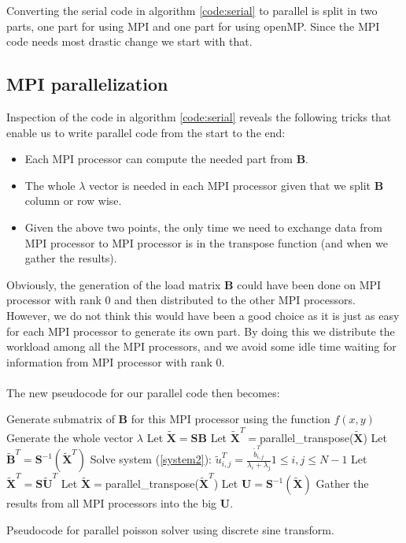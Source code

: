 Converting the serial code in algorithm \ref{code:serial} to parallel is split in two parts, one part for using MPI and one part for using openMP. Since the MPI code needs most drastic change we start with that.

\subsection*{MPI parallelization}
Inspection of the code in algorithm \ref{code:serial} reveals the following tricks that enable us to write parallel code from the start to the end:
\begin{itemize}
\item Each MPI processor can compute the needed part from $\textbf{B}$.
\item The whole $\lambda$ vector is needed in each MPI processor given that we split $\textbf{B}$ column or row wise.
\item Given the above two points, the only time we need to exchange data from MPI processor to MPI processor is in the transpose function (and when we gather the results).
\end{itemize}
Obviously, the generation of the load matrix $\mathbf{B}$ could have been done on MPI processor with rank $0$ and then distributed to the other MPI processors. However, we do not think this would have been a good choice as it is just as easy for each MPI processor to generate its own part. By doing this we distribute the workload among all the MPI processors, and we avoid some idle time waiting for information from MPI processor with rank $0$.\\
\\
The new pseudocode for our parallel code then becomes:\\
\begin{algorithm}[H]
 Generate submatrix of $\textbf{B}$ for this MPI processor using the function $f(x,y)$\;
 Generate the whole vector $\lambda$ \;
 Let $\mathbf{\widetilde{X}} = \mathbf{SB}$  \;
 Let $\mathbf{\widetilde{X}}^T = $parallel\_transpose($\mathbf{\widetilde{X}}$)   \;
 Let $\mathbf{\widetilde{B}}^T = \mathbf{S}^{-1}(\mathbf{\widetilde{X}}^T)$ \;
 Solve system (\ref{system2}): $\tilde{u}^T_{i,j} = \frac{\tilde{b}^T_{i,j}}{\lambda_i + \lambda_j} 1 \leq i, j \leq N-1$\;
 Let $\mathbf{\widetilde{X}}^T = \mathbf{S}\mathbf{\tilde{U}}^T$  \;
 Let $\mathbf{\widetilde{X}} = $parallel\_transpose($\mathbf{\widetilde{X}}^T$)   \;
 Let $\mathbf{U} = \mathbf{S}^{-1}(\mathbf{\widetilde{X}}) $ \;
 Gather the results from all MPI processors into the big $\mathbf{U}$.
 \caption{Pseudocode for parallel poisson solver using discrete sine transform.}
 \label{code:parallel}
\end{algorithm}
